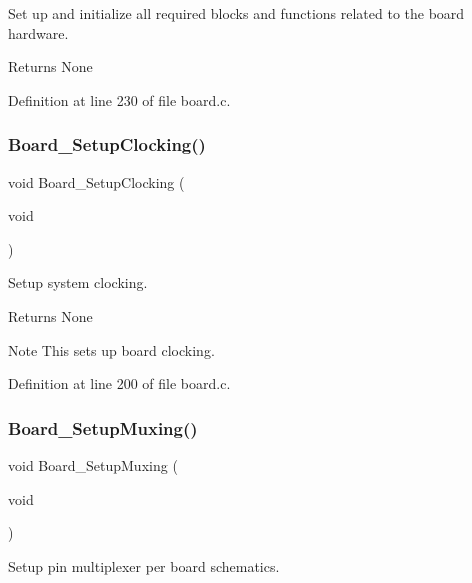 Set up and initialize all required blocks and functions related to the board hardware. 

\begin{DoxyReturn}{Returns}
None 
\end{DoxyReturn}


Definition at line 230 of file board.\+c.

\mbox{\label{group__hal_gae417dc93d00f1a89f74220e569fac777}} 
\subsubsection{\texorpdfstring{Board\+\_\+\+Setup\+Clocking()}{Board\_SetupClocking()}}
{\footnotesize\ttfamily void Board\+\_\+\+Setup\+Clocking (\begin{DoxyParamCaption}\item[{void}]{ }\end{DoxyParamCaption})}



Setup system clocking. 

\begin{DoxyReturn}{Returns}
None 
\end{DoxyReturn}
\begin{DoxyNote}{Note}
This sets up board clocking. 
\end{DoxyNote}


Definition at line 200 of file board.\+c.

\mbox{\label{group__hal_ga8ac1dc465c66e1cc00f5ffd346904d97}} 
\subsubsection{\texorpdfstring{Board\+\_\+\+Setup\+Muxing()}{Board\_SetupMuxing()}}
{\footnotesize\ttfamily void Board\+\_\+\+Setup\+Muxing (\begin{DoxyParamCaption}\item[{void}]{ }\end{DoxyParamCaption})}



Setup pin multiplexer per board schematics. 

